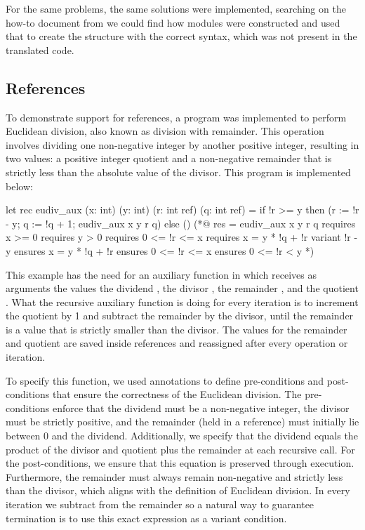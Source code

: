 For the same problems, the same solutions were implemented, searching on the how-to document from \cml we could find how
modules were constructed and used that to create the structure  with the correct syntax, which was not present in 
the translated code.

\subsection{References}

To demonstrate support for references, a program was implemented to perform Euclidean division, also known as division with remainder. 
This operation involves dividing one non-negative integer by another positive integer, resulting in two values: a positive integer 
quotient and a non-negative remainder that is strictly less than the absolute value of the divisor. This program is implemented below:

\begin{gospell}
let rec eudiv_aux (x: int) (y: int) (r: int ref) (q: int ref) =
  if !r >= y then (r := !r - y; q := !q + 1; eudiv_aux x y r q)
  else ()
(*@ res = eudiv_aux x y r q
    requires x >= 0
    requires y > 0
    requires 0 <= !r <= x
    requires x = y * !q + !r
    variant !r - y
    ensures x = y * !q + !r
    ensures 0 <= !r <= x
    ensures 0 <= !r < y *)
\end{gospell}

This example has the need for an auxiliary function in  which receives as arguments the values the dividend 
, the divisor , the remainder , and the quotient . What the recursive auxiliary 
function is doing for every iteration is to increment the quotient by 1 and subtract the remainder by the divisor, until the remainder 
is a value that is strictly smaller than the divisor. The values for the remainder and quotient are saved inside references and 
reassigned after every operation or iteration.

To specify this function, we used \gospel annotations to define pre-conditions and post-conditions that ensure the correctness of 
the Euclidean division. The pre-conditions enforce that the dividend must be a non-negative integer, the divisor must be strictly 
positive, and the remainder (held in a reference) must initially lie between 0 and the dividend. Additionally, we specify that the 
dividend equals the product of the divisor and quotient plus the remainder at each recursive call. For the post-conditions, we ensure 
that this equation is preserved through execution. Furthermore, the remainder must always remain non-negative and strictly less 
than the divisor, which aligns with the definition of Euclidean division. In every iteration we subtract  from the
remainder  so a natural way to guarantee termination is to use this exact expression as a variant condition.

